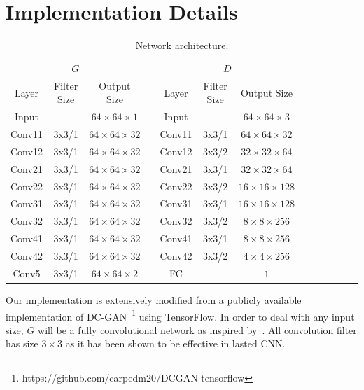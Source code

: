 \documentclass[10pt,twocolumn,letterpaper]{article}
\begin{document}
\section{Implementation Details}



\begin{table}[t!]
\caption{\small Network architecture.}
\label{tab:network}
\begin{center}
\small
\begin{tabular}{ @{}ccccccccccccc@{} }
\toprule
\multicolumn{3}{c}{$G$} & \hspace{2mm} 
& \multicolumn{3}{c}{$D$} \\
\cmidrule(r){1-3}
\cmidrule(r){5-7}

Layer & Filter Size & Output Size && Layer & Filter Size & Output Size \\ \midrule
Input  &       & $64\times64\times1$  && Input  &       & $64\times64\times3$ \\ \midrule
Conv11 & 3x3/1 & $64\times64\times32$ && Conv11& 3x3/1 & $64\times64\times32$ \\
Conv12 & 3x3/1 & $64\times64\times32$ && Conv12& 3x3/2 & $32\times32\times64$ \\ \midrule

Conv21 & 3x3/1 & $64\times64\times32$ && Conv21& 3x3/1 & $32\times32\times64$ \\
Conv22 & 3x3/1 & $64\times64\times32$ && Conv22& 3x3/2 & $16\times16\times128$ \\ \midrule

Conv31 & 3x3/1 & $64\times64\times32$ && Conv31& 3x3/1 & $16\times16\times128$ \\
Conv32 & 3x3/1 & $64\times64\times32$ && Conv32& 3x3/2 & $8\times8\times256$ \\   \midrule

Conv41 & 3x3/1 & $64\times64\times32$ && Conv41& 3x3/1 & $8\times8\times256$ \\
Conv42 & 3x3/1 & $64\times64\times32$ && Conv42& 3x3/2 & $4\times4\times256$ \\  \midrule

Conv5  & 3x3/1 & $64\times64\times2$  && FC     &       & $1$ \\ \bottomrule
\end{tabular}%
\end{center}
\end{table}

Our implementation is extensively modified from a publicly available implementation of DC-GAN~\footnote{https://github.com/carpedm20/DCGAN-tensorflow} using TensorFlow. In order to deal with any input size, $G$ will be a fully convolutional network as inspired by~\cite{long2015fully}. All convolution filter has size $3 \times 3$ as it has been shown to be effective in lasted CNN. 
\end{document}
